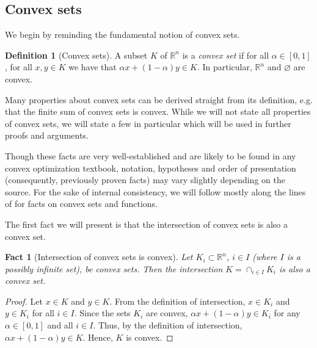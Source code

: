 \documentclass[smallextended,numbook,nospthms]{svjour3}
\theoremstyle{plain}
\newtheorem{fact}[theorem]{Fact}
\theoremstyle{definition}
\newtheorem{definition}[theorem]{Definition}
\def\RR{\mathds R}
\begin{document}
\subsection{Convex sets}
We begin by reminding the fundamental notion of convex sets.
\begin{definition}[Convex sets]\label{def:convex}
	A subset $K$ of $\RR^n$ is a \emph{convex set} if for all $\alpha \in [0,1]$, for all $x,y \in K$ we have that $\alpha x + (1-\alpha)y \in K$. In particular, $\RR^n$ and $\varnothing$ are convex.
	\end{definition}

Many properties about convex sets can be derived straight from its definition, e.g. that the finite sum of convex sets is convex. While we will not state all properties of convex sets, we will state a few in particular which will be used in further proofs and arguments.

Though these facts are very well-established and are likely to be found in any convex optimization textbook, notation, hypotheses and order of presentation (consequently, previously proven facts) may vary slightly depending on the source. For the sake of internal consistency, we will follow mostly along the lines of \cite{Izmailov:2014} for facts on convex sets and functions.

The first fact we will present is that the intersection of convex sets is also a convex set.

\begin{fact}[Intersection of convex sets is convex]\label{fact:cap convex}
Let $K_i \subset \RR^n$, $i \in I$ (where $I$ is a possibly infinite set), be convex sets. Then the intersection $K=\cap_{i \in I}K_i$ is also a convex set.
\end{fact}	
\begin{proof}
	Let $x \in K$ and $y \in K$. From the definition of intersection, $x \in K_i$ and $y \in K_i$ for all $i \in I$. Since the sets $K_i$ are convex, $\alpha x + (1-\alpha)y \in K_i$ for any $\alpha \in [0,1]$ and all $i \in I$. Thus, by the definition of intersection, $\alpha x + (1-\alpha)y \in K$. Hence, $K$ is convex.
\end{proof}
\end{document}
